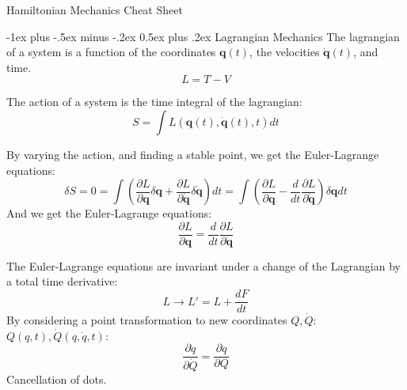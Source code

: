 \documentclass[10pt,landscape]{article}
\makeatletter
\renewcommand{\section}{\@startsection{section}{1}{0mm}%
                                {-1ex plus -.5ex minus -.2ex}%
                                {0.5ex plus .2ex}%
                                {\normalfont\large\bfseries}}
\makeatother
\begin{document}
\raggedright
\footnotesize
\begin{multicols}{3}


\setlength{\premulticols}{1pt}
\setlength{\postmulticols}{1pt}
\setlength{\multicolsep}{1pt}
\setlength{\columnsep}{2pt}

\begin{center}
     \Large{Hamiltonian Mechanics Cheat Sheet} \\
\end{center}

\section{Lagrangian Mechanics}
The lagrangian of a system is a function of the coordinates $\mathbf{q}(t)$, the velocities $\mathbf{\dot q}(t)$, and time.
\begin{equation}
	L = T-V 
\end{equation}

The action of a system is the time integral of the lagrangian:
\begin{equation}
	S = \int L(\mathbf{ q}(t), \mathbf {\dot q}(t), t) dt
\end{equation}

By varying the action, and finding a stable point, we get the Euler-Lagrange equations:
\begin{equation}
	\delta S = 0 = \int \left(\frac{\partial L}{\partial \mathbf{q}}\delta \mathbf{q} + \frac{\partial L}{\partial \mathbf{\dot q}} \delta \mathbf{\dot q}\right)dt = \int \left(\frac{\partial L}{\partial \mathbf{q}}-\frac{d}{dt} \frac{\partial L}{\partial \mathbf{\dot q}} \right)\delta \mathbf{q} dt
\end{equation}
And we get the Euler-Lagrange equations:
\begin{equation}
	\frac{\partial L}{\partial \mathbf{q}}=\frac{d}{dt}\frac{\partial L}{\partial \mathbf{\dot q}}
\end{equation}

The Euler-Lagrange equations are invariant under a change of the Lagrangian by a total time derivative:
\begin{equation}
	L \rightarrow L' = L + \frac{dF}{dt}
\end{equation}
By considering a point transformation to new coordinates $Q, \dot Q$: $Q(q, t), \dot Q(q, \dot q, t) $:
\begin{equation}
	\frac{\partial \dot q}{\partial \dot Q} = \frac{\partial q}{\partial Q}
\end{equation}
Cancellation of dots.

\end{multicols}
\end{document}

